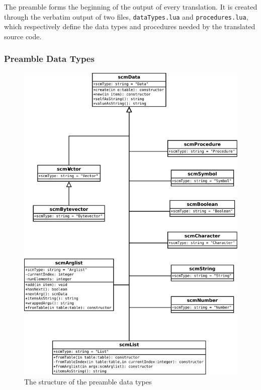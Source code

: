 The preamble forms the beginning of the output of every translation. It is
created through the verbatim output of two files, \texttt{dataTypes.lua} and
\texttt{procedures.lua}, which respectively define the data types and procedures
needed by the translated source code.

\subsubsection{Preamble Data Types}

\begin{figure}
\centering
\includegraphics[width=\textwidth]{scmDataUML.pdf}
\caption{The structure of the preamble data types}
\label{fig:scmDataUML}
\end{figure}

